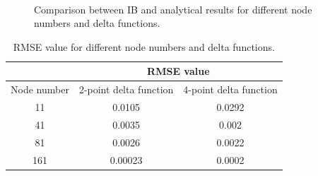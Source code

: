\begin{figure}[H]
{	}
	\quad
	\\
	\quad
	\caption{Comparison between IB and analytical results for different node numbers and delta functions.}
	\label{fig:C3_classicalIBResultNodeNumber}
\end{figure}

\begin{table}[H]
\centering
\begin{tabular}{c | c | c}
	  & \multicolumn{2}{c}{RMSE value} \\ \hline
	 Node number & 2-point delta function & 4-point delta function \\ \hline \hline
	 11 & 0.0105 & 0.0292 \\ \hline
	 41 & 0.0035 & 0.002 \\ \hline
	 81 & 0.0026 & 0.0022 \\ \hline
	 161 & 0.00023 & 0.0002 \\
\end{tabular}
\caption{RMSE value for different node numbers and delta functions.}
\label{table:C3_classicalIBResultNodeNumberRMSE}
\end{table}

